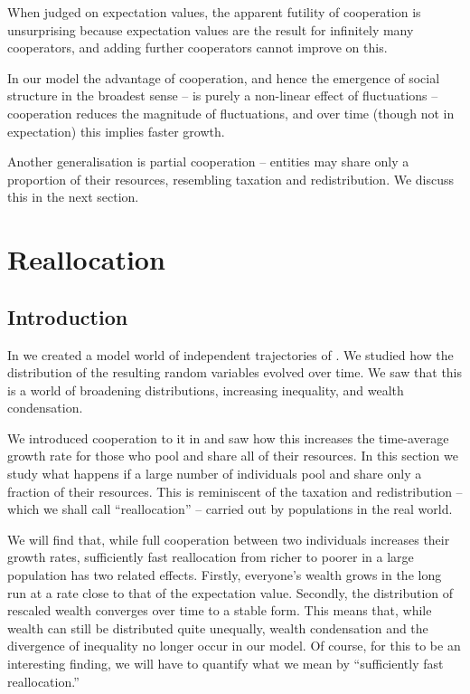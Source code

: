 When judged on expectation values, the apparent futility of cooperation is unsurprising
because expectation values are the result for infinitely 
many cooperators, and adding further cooperators cannot improve on this.

In our model the advantage of cooperation, and hence the emergence
of social structure in the broadest sense -- is purely a non-linear 
effect of fluctuations -- cooperation reduces the magnitude of 
fluctuations, and over time (though not in expectation) this implies faster growth. 


Another generalisation is partial cooperation -- entities may share only
a proportion of their resources, resembling taxation and redistribution. We discuss this in the next section.


\section{Reallocation}


\subsection{Introduction}

In  we created a model world of independent trajectories of \GBM. We studied how the distribution of the resulting random variables evolved over time. We saw that this is a world of broadening distributions, increasing inequality, and wealth condensation.

We introduced cooperation to it in  and saw how this increases the time-average growth rate for those who pool and share all of their resources. In this section we study what happens if a large number of individuals pool and share only a fraction of their resources. This is reminiscent of the taxation and redistribution -- which we shall call ``reallocation'' -- carried out by populations in the real world.

We will find that, while full cooperation between two individuals increases their growth rates, sufficiently fast reallocation from richer to poorer in a large population has two related effects. Firstly, everyone's wealth grows in the long run at a rate close to that of the expectation value. Secondly, the distribution of rescaled wealth converges over time to a stable form. This means that, while wealth can still be distributed quite unequally, wealth condensation and the divergence of inequality no longer occur in our model. Of course, for this to be an interesting finding, we will have to quantify what we mean by ``sufficiently fast reallocation.''

